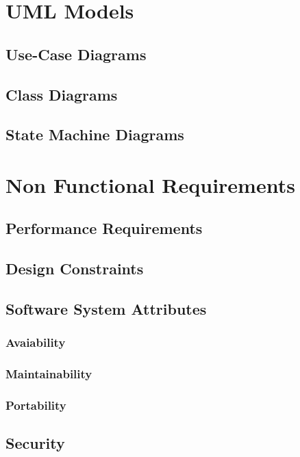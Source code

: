 \documentclass{report}
\begin{document}
	\section{UML Models}

		\subsection{Use-Case Diagrams}

		\subsection{Class Diagrams}

		\subsection{State Machine Diagrams}

	\section{Non Functional Requirements}

		\subsection{Performance Requirements}

		\subsection{Design Constraints}

		\subsection{Software System Attributes}

			\subsubsection{Avaiability}

			\subsubsection{Maintainability}

			\subsubsection{Portability}

		\subsection{Security}
\end{document}
